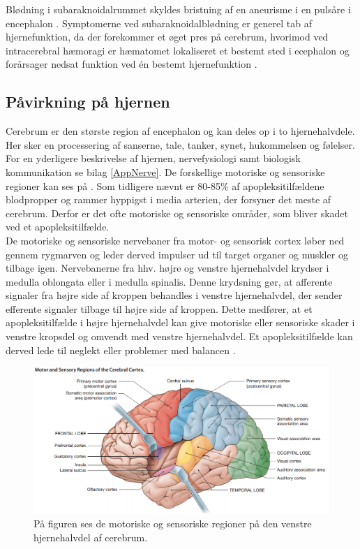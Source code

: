 Blødning i subaraknoidalrummet skyldes bristning af en aneurisme i en pulsåre i encephalon \cite{Schulze2011}. Symptomerne ved subaraknoidalblødning er generel tab af hjernefunktion, da der forekommer et øget pres på cerebrum, hvorimod ved intracerebral hæmoragi er hæmatomet lokaliseret et bestemt sted i ecephalon og forårsager nedsat funktion ved én bestemt hjernefunktion \cite{Caplan2006}. 

\subsection{Påvirkning på hjernen}
Cerebrum er den største region af encephalon og kan deles op i to hjernehalvdele. Her sker en processering af sanserne, tale, tanker, synet, hukommelsen og følelser. \cite{Martini2012} For en yderligere beskrivelse af hjernen, nervefysiologi samt biologisk kommunikation se bilag \ref{AppNerve}. De forskellige motoriske og sensoriske regioner kan ses på . Som tidligere nævnt er 80-85\% af apopleksitilfældene blodpropper og rammer hyppigst i media arterien, der forsyner det meste af cerebrum. Derfor er det ofte motoriske og sensoriske områder, som bliver skadet ved et apopleksitilfælde. \cite{Sundhed.dk,Gade2004,Boss2010} \\
De motoriske og sensoriske nervebaner fra motor- og sensorisk cortex løber ned gennem rygmarven og leder derved impulser ud til target organer og muskler og tilbage igen. Nervebanerne fra hhv. højre og venstre hjernehalvdel krydser i medulla oblongata eller i medulla spinalis. Denne krydsning gør, at afferente signaler fra højre side af kroppen behandles i venstre hjernehalvdel, der sender efferente signaler tilbage til højre side af kroppen. \cite{Martini2012,Stanfield2014} Dette medfører, at et apopleksitilfælde i højre hjernehalvdel kan give motoriske eller sensoriske skader i venstre kropsdel og omvendt med venstre hjernehalvdel. Et apopleksitilfælde kan derved lede til neglekt eller problemer med balancen \cite{Sundhedsstyrelsen2009,Nichols1997}.

\begin{figure}[H]
	\centering
	\includegraphics[scale=0.6]{figures/bProblemanalyse/Encephalon.png}
	\caption{På figuren ses de motoriske og sensoriske regioner på den venstre hjernehalvdel af cerebrum. \cite{Martini2012}}
	\label{Enc}
\end{figure}

